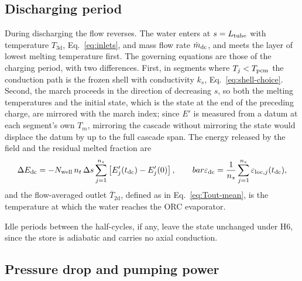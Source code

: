 \subsection{Discharging period}
\label{sec:BB_dc}

During discharging the flow reverses. The water enters at $s=L_{\mathrm{tube}}$ with
temperature $T_\mathrm{3d}$, Eq.~\eqref{eq:inlets}, and mass flow rate
$\dot m_\mathrm{dc}$, and meets the layer of lowest melting temperature first.
The governing equations are those of the charging period, with two
differences. First, in segments where $T_j<T_{\mathrm{pcm}}$ the conduction path is the
frozen shell with conductivity $k_s$, Eq.~\eqref{eq:shell-choice}. Second, the
march proceeds in the direction of decreasing $s$, so both the melting
temperatures and the initial state, which is the state at the end of the
preceding charge, are mirrored with the march index; since $E'$ is measured
from a datum at each segment's own $T_m$, mirroring the cascade without
mirroring the state would displace the datum by up to the full cascade span.
The energy released by the field and the residual melted fraction are
\begin{equation}
  \Delta E_\mathrm{dc}=-N_{\mathrm{well}}\,n_t\,\Delta s\sum_{j=1}^{n_s}
     \left[E'_j(t_\mathrm{dc})-E'_j(0)\right],
  \qquad
  bar\varepsilon_\mathrm{dc}=\frac1{n_s}\sum_{j=1}^{n_s}
     \varepsilon_{\mathrm{loc},j}(t_\mathrm{dc}),
  \label{eq:Edc}
\end{equation}
and the flow-averaged outlet $\overline{T}_\mathrm{2d}$, defined as in
Eq.~\eqref{eq:Tout-mean}, is the temperature at which the water reaches the ORC
evaporator.

Idle periods between the half-cycles, if any, leave the state unchanged under
H6, since the store is adiabatic and carries no axial conduction.

\subsection{Pressure drop and pumping power}
\label{sec:pumping}

